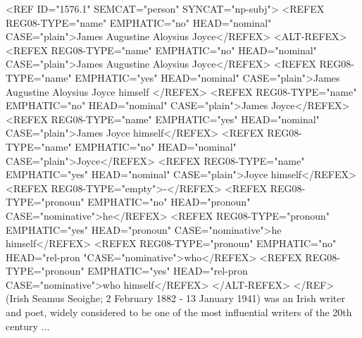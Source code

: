  <REF ID="1576.1" SEMCAT="person" SYNCAT="np-subj">
    <REFEX REG08-TYPE="name" EMPHATIC="no" HEAD="nominal" CASE="plain">James Augustine Aloysius Joyce</REFEX>
    <ALT-REFEX>
        <REFEX REG08-TYPE="name" EMPHATIC="no" HEAD="nominal" CASE="plain">James Augustine Aloysius Joyce</REFEX>
        <REFEX REG08-TYPE="name" EMPHATIC="yes" HEAD="nominal" CASE="plain">James Augustine Aloysius Joyce himself </REFEX>
        <REFEX REG08-TYPE="name" EMPHATIC="no" HEAD="nominal" CASE="plain">James Joyce</REFEX>
        <REFEX REG08-TYPE="name" EMPHATIC="yes" HEAD="nominal" CASE="plain">James Joyce himself</REFEX>
        <REFEX REG08-TYPE="name" EMPHATIC="no" HEAD="nominal" CASE="plain">Joyce</REFEX>
        <REFEX REG08-TYPE="name" EMPHATIC="yes" HEAD="nominal" CASE="plain">Joyce himself</REFEX>
        <REFEX REG08-TYPE="empty">-</REFEX>
        <REFEX REG08-TYPE="pronoun" EMPHATIC="no" HEAD="pronoun" CASE="nominative">he</REFEX>
        <REFEX REG08-TYPE="pronoun" EMPHATIC="yes" HEAD="pronoun" CASE="nominative">he himself</REFEX>
        <REFEX REG08-TYPE="pronoun" EMPHATIC="no" HEAD="rel-pron "CASE="nominative">who</REFEX>
        <REFEX REG08-TYPE="pronoun" EMPHATIC="yes" HEAD="rel-pron CASE="nominative">who himself</REFEX>
    </ALT-REFEX>
</REF>
(Irish Seamus Seoighe; 2 February 1882 - 13 January 1941) was an Irish writer and poet,
widely considered to be one of the most influential writers of the 20th century ...